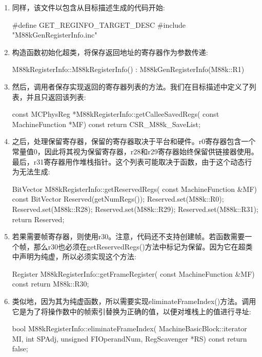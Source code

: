 \begin{enumerate}
\item
同样，该文件以包含从目标描述生成的代码开始:

\begin{cpp}
#define GET_REGINFO_TARGET_DESC
#include "M88kGenRegisterInfo.inc"
\end{cpp}

\item
构造函数初始化超类，将保存返回地址的寄存器作为参数传递:

\begin{cpp}
M88kRegisterInfo::M88kRegisterInfo()
    : M88kGenRegisterInfo(M88k::R1) {}
\end{cpp}

\item
然后，调用者保存实现返回的寄存器列表的方法。我们在目标描述中定义了列表，并且只返回该列表:

\begin{cpp}
const MCPhysReg *M88kRegisterInfo::getCalleeSavedRegs(
        const MachineFunction *MF) const {
    return CSR_M88k_SaveList;
}
\end{cpp}

\item
之后，处理保留寄存器，保留的寄存器取决于平台和硬件。r0寄存器包含一个常量值0，因此将其视为保留寄存器，r28和r29寄存器始终保留供链接器使用。最后，r31寄存器用作堆栈指针。这个列表可能取决于函数，由于这个动态行为无法生成:

\begin{cpp}
BitVector M88kRegisterInfo::getReservedRegs(
        const MachineFunction &MF) const {
    BitVector Reserved(getNumRegs());
    Reserved.set(M88k::R0);
    Reserved.set(M88k::R28);
    Reserved.set(M88k::R29);
    Reserved.set(M88k::R31);
    return Reserved;
}
\end{cpp}

\item
若果需要帧寄存器，则使用r30。注意，代码还不支持创建帧。若函数需要一个帧，那么r30也必须在getReservedRegs()方法中标记为保留。因为它在超类中声明为纯虚，所以必须实现这个方法:

\begin{cpp}
Register M88kRegisterInfo::getFrameRegister(
        const MachineFunction &MF) const {
    return M88k::R30;
}
\end{cpp}

\item
类似地，因为其为纯虚函数，所以需要实现eliminateFrameIndex()方法。调用它是为了将操作数中的帧索引替换为正确的值，以便对堆栈上的值进行寻址:

\begin{cpp}
bool M88kRegisterInfo::eliminateFrameIndex(
        MachineBasicBlock::iterator MI, int SPAdj,
        unsigned FIOperandNum, RegScavenger *RS) const {
    return false;
}
\end{cpp}

\end{enumerate}

